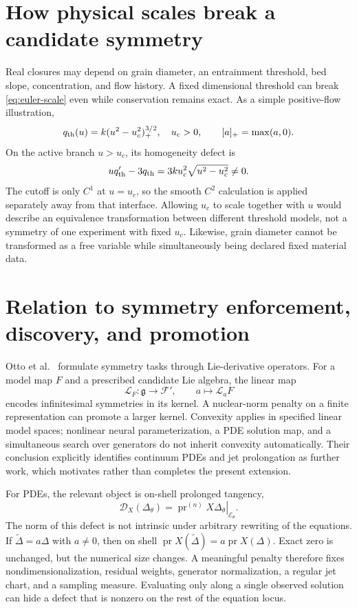\documentclass[11pt,a4paper,oneside]{report}
\numberwithin{equation}{chapter}
\newcommand{\E}{\mathcal E}
\newcommand{\pr}{\operatorname{pr}}
\begin{document}
\section{How physical scales break a candidate symmetry}
Real closures may depend on grain diameter, an entrainment threshold, bed slope, concentration, and flow history. A fixed dimensional threshold can break \eqref{eq:euler-scale} even while conservation remains exact. As a simple positive-flow illustration,
\begin{equation}\label{eq:threshold}
q_{\rm th}(u)=k(u^2-u_c^2)_+^{3/2},\quad u_c>0,
\qquad [a]_+=\max(a,0).
\end{equation}
On the active branch $u>u_c$, its homogeneity defect is
\begin{equation}
uq_{\rm th}'-3q_{\rm th}=3ku_c^2\sqrt{u^2-u_c^2}\ne0.
\end{equation}
The cutoff is only $C^1$ at $u=u_c$, so the smooth $C^2$ calculation is applied separately away from that interface. Allowing $u_c$ to scale together with $u$ would describe an equivalence transformation between different threshold models, not a symmetry of one experiment with fixed $u_c$. Likewise, grain diameter cannot be transformed as a free variable while simultaneously being declared fixed material data.

\section{Relation to symmetry enforcement, discovery, and promotion}
Otto et al.\ \cite{otto} formulate symmetry tasks through Lie-derivative operators. For a model map $F$ and a prescribed candidate Lie algebra, the linear map
\begin{equation}
\mathcal L_F:\mathfrak g\to\mathcal F',\qquad a\mapsto\mathcal L_aF
\end{equation}
encodes infinitesimal symmetries in its kernel. A nuclear-norm penalty on a finite representation can promote a larger kernel. Convexity applies in specified linear model spaces; nonlinear neural parameterization, a PDE solution map, and a simultaneous search over generators do not inherit convexity automatically. Their conclusion explicitly identifies continuum PDEs and jet prolongation as further work, which motivates rather than completes the present extension.

For PDEs, the relevant object is on-shell prolonged tangency,
\begin{equation}\label{eq:defectmodel}
\mathcal D_X(\Delta_\theta)=\left.\pr^{(n)}X\Delta_\theta\right|_{\E_\theta}.
\end{equation}
The norm of this defect is not intrinsic under arbitrary rewriting of the equations. If $\widetilde\Delta=a\Delta$ with $a\ne0$, then on shell $\pr X(\widetilde\Delta)=a\pr X(\Delta)$. Exact zero is unchanged, but the numerical size changes. A meaningful penalty therefore fixes nondimensionalization, residual weights, generator normalization, a regular jet chart, and a sampling measure. Evaluating only along a single observed solution can hide a defect that is nonzero on the rest of the equation locus.
\end{document}
